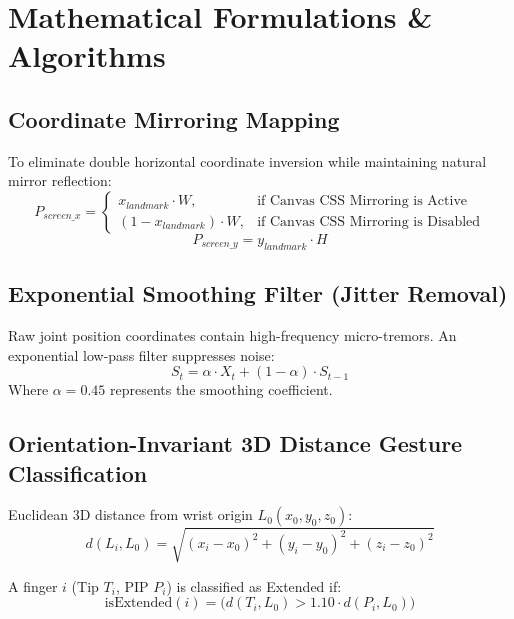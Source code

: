 \documentclass[11pt,a4paper]{article}
\begin{document}
\section{Mathematical Formulations \& Algorithms}

\subsection{Coordinate Mirroring Mapping}
To eliminate double horizontal coordinate inversion while maintaining natural mirror reflection:
\begin{equation}
P_{screen\_x} = \begin{cases} 
x_{landmark} \cdot W, & \text{if Canvas CSS Mirroring is Active} \\
(1 - x_{landmark}) \cdot W, & \text{if Canvas CSS Mirroring is Disabled}
\end{cases}
\end{equation}
\begin{equation}
P_{screen\_y} = y_{landmark} \cdot H
\end{equation}

\subsection{Exponential Smoothing Filter (Jitter Removal)}
Raw joint position coordinates contain high-frequency micro-tremors. An exponential low-pass filter suppresses noise:
\begin{equation}
S_t = \alpha \cdot X_t + (1 - \alpha) \cdot S_{t-1}
\end{equation}
Where $\alpha = 0.45$ represents the smoothing coefficient.

\subsection{Orientation-Invariant 3D Distance Gesture Classification}
Euclidean 3D distance from wrist origin $L_0(x_0, y_0, z_0)$:
\begin{equation}
d(L_i, L_0) = \sqrt{(x_i - x_0)^2 + (y_i - y_0)^2 + (z_i - z_0)^2}
\end{equation}

A finger $i$ (Tip $T_i$, PIP $P_i$) is classified as Extended if:
\begin{equation}
\text{isExtended}(i) = \Big( d(T_i, L_0) > 1.10 \cdot d(P_i, L_0) \Big)
\end{equation}
\end{document}
